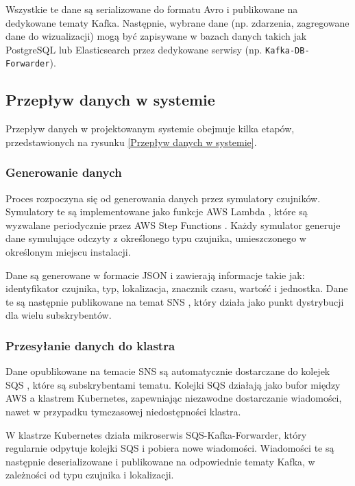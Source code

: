 Wszystkie te dane są serializowane do formatu Avro i publikowane na dedykowane tematy Kafka. Następnie, wybrane dane (np. zdarzenia, zagregowane dane do wizualizacji) mogą być zapisywane w bazach danych takich jak PostgreSQL lub Elasticsearch przez dedykowane serwisy (np. \texttt{Kafka-DB-Forwarder}).

\subsection{Przepływ danych w systemie}
\label{subsec:przeplyw_danych}

Przepływ danych w projektowanym systemie obejmuje kilka etapów, przedstawionych na rysunku \ref{Przepływ danych w systemie}.


\subsubsection{Generowanie danych}
\label{subsubsec:generowanie_danych}

Proces rozpoczyna się od generowania danych przez symulatory czujników. Symulatory te są implementowane jako funkcje AWS Lambda \cite{aws_lambda_docs},
które są wyzwalane periodycznie przez AWS Step Functions \cite{aws_step_functions_docs}.
Każdy symulator generuje dane symulujące odczyty z określonego typu czujnika,
umieszczonego w określonym miejscu instalacji.

Dane są generowane w formacie JSON i zawierają informacje takie jak: identyfikator czujnika, typ, lokalizacja, znacznik czasu, wartość i
jednostka. Dane te są następnie publikowane na temat SNS \cite{sns_docs}, który działa jako punkt dystrybucji dla wielu subskrybentów.

\subsubsection{Przesyłanie danych do klastra}
\label{subsubsec:przesylanie_danych}

Dane opublikowane na temacie SNS są automatycznie dostarczane do kolejek SQS \cite{sqs_docs}, które są subskrybentami tematu. Kolejki SQS działają jako bufor między AWS a klastrem Kubernetes, zapewniając niezawodne dostarczanie wiadomości, nawet w przypadku tymczasowej niedostępności klastra.

W klastrze Kubernetes działa mikroserwis SQS-Kafka-Forwarder, który regularnie odpytuje kolejki SQS i pobiera nowe wiadomości. Wiadomości te są następnie deserializowane i publikowane na odpowiednie tematy Kafka, w zależności od typu czujnika i lokalizacji.

